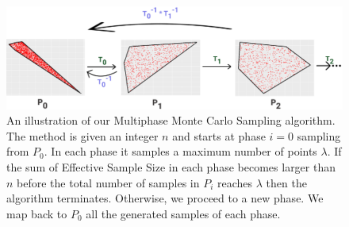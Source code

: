    \begin{figure}[!htbp]
      \includegraphics[width=1.0\columnwidth]{figures/sampling_extra_phase_croped.png}
      \caption[A Multiphase Monte Carlo Sampling algorithm]{
         An illustration of our Multiphase Monte Carlo Sampling algorithm. The method is given an integer $n$ and starts at phase $i=0$ sampling from $P_0$. In each phase it samples a maximum number of points $\lambda$. If the sum of Effective Sample Size in each phase becomes larger than $n$ before the total number of samples in $P_i$ reaches $\lambda$ then the algorithm terminates. Otherwise, we proceed to a  new phase.
    We map back to $P_0$ all the generated samples of each phase.
      }
      \label{fig:mmcs}
   \end{figure}




